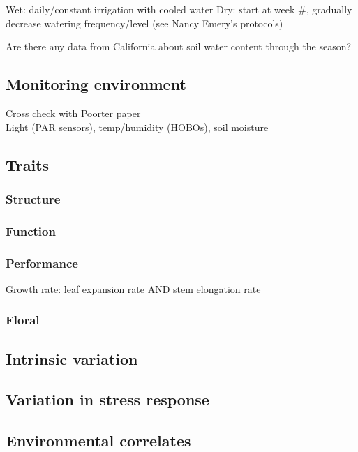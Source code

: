 \documentclass[11pt, oneside]{article}
\begin{document}
			Wet: daily/constant irrigation with cooled water
			Dry: start at week \#, gradually decrease watering frequency/level (see Nancy Emery's protocols)

			Are there any data from California about soil water content through the season?

\subsection*{Monitoring environment}

		Cross check with Poorter paper \\
		Light (PAR sensors), temp/humidity (HOBOs), soil moisture

\subsection*{Traits}

\subsubsection*{Structure}
\subsubsection*{Function}
\subsubsection*{Performance}

Growth rate: leaf expansion rate AND stem elongation rate

\subsubsection*{Floral}

\subsection*{Intrinsic variation}
\subsection*{Variation in stress response} %

\subsection*{Environmental correlates}

\end{document}
